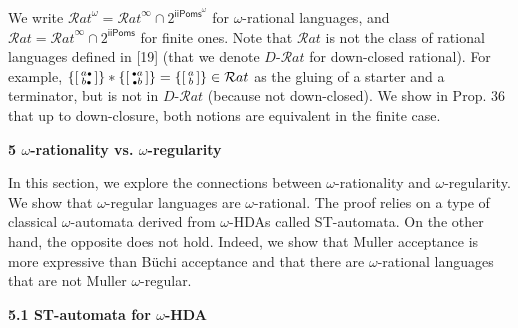 We write ${\mathcal{R}at}^{\omega}={\mathcal{R}at}^{\infty}\cap 2^{\mathsf{iiPoms}^{\omega}}$ for $\omega$-rational languages, and $\mathcal{R}at={\mathcal{R}at}^{\infty}\cap 2^{\mathsf{iiPoms}}$ for finite ones. Note that $\mathcal{R}at$ is not the class of rational languages defined in [19] (that we denote $D\text{-}\mathcal{R}at$ for down-closed rational). For example, ${\{\left[\begin{smallmatrix}a\vbox{\hbox{\tiny$\bullet$}}\\
b\vbox{\hbox{\tiny$\bullet$}}\end{smallmatrix}\right]\}}*{\{\left[\begin{smallmatrix}\vbox{\hbox{\tiny$\bullet$}}a\\
\vbox{\hbox{\tiny$\bullet$}}b\end{smallmatrix}\right]\}}={\{\left[\begin{smallmatrix}a\\
b\end{smallmatrix}\right]\}}\in\mathcal{R}at$ as the gluing of a starter and a terminator, but is not in $D\text{-}\mathcal{R}at$ (because not down-closed). We show in Prop. 36 that up to down-closure, both notions are equivalent in the finite case.\par
 
 


 
\par\medskip\noindent\textbf{5 $\omega$-rationality vs. $\omega$-regularity}\par
 
 
In this section, we explore the connections between $\omega$-rationality and $\omega$-regularity. We show that $\omega$-regular languages are $\omega$-rational. The proof relies on a type of classical $\omega$-automata derived from $\omega$-HDAs called ST-automata. On the other hand, the opposite does not hold. Indeed, we show that Muller acceptance is more expressive than Büchi acceptance and that there are $\omega$-rational languages that are not Muller $\omega$-regular.\par
 
 
 
\par\medskip\noindent\textbf{5.1 ST-automata for $\omega$-HDA}\par
 
